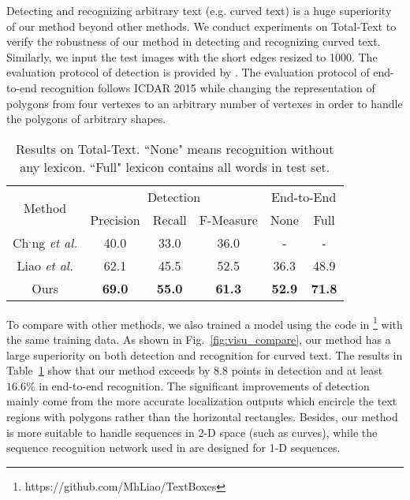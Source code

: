 \documentclass[runningheads]{llncs}
\begin{document}
Detecting and recognizing arbitrary text (e.g. curved text) is a huge superiority of our method beyond other methods. We conduct experiments on Total-Text to verify the robustness of our method in detecting and recognizing curved text. Similarly, we input the test images with the short edges resized to 1000.  The evaluation protocol of detection is provided by \cite{CK2017}.
The evaluation protocol of end-to-end recognition follows ICDAR 2015 while changing the representation of polygons from four vertexes to an arbitrary number of vertexes in order to handle the polygons of arbitrary shapes.

\begin{table}[!tp]
\begin{centering}
\caption{Results on Total-Text. ``None" means recognition without any lexicon. ``Full" lexicon contains all words in test set.}
\label{tab_total}
\begin{tabular}{|c|c|c|c|c|c|}
\hline 
\multirow{2}{*}{Method} & \multicolumn{3}{c|}{Detection} & \multicolumn{2}{c|}{End-to-End}\tabularnewline
\cline{2-6} 
 & Precision & Recall & F-Measure & None & Full\tabularnewline

\hline 
\hline
Ch$^,$ng \emph{et al.} \cite{CK2017} &40.0 &33.0 &36.0 &-  & - \tabularnewline
\hline
Liao \emph{et al.} \cite{liao2017textboxes} &62.1 &45.5  &52.5 & 36.3 & 48.9 \tabularnewline
\hline 
\hline 
Ours &\textbf{69.0} &\textbf{55.0}  &\textbf{61.3} &\textbf{52.9} &\textbf{71.8} \tabularnewline
\hline 
\end{tabular}
\par\end{centering}
\end{table}

To compare with other methods, we also trained a model \cite{liao2017textboxes} using the code in \cite{liao2017textboxes} \footnote{https://github.com/MhLiao/TextBoxes} 
with the same training data. As shown in Fig.~\ref{fig:visu_compare}, our method has a large superiority on both detection and recognition for curved text. The results in Table~\ref{tab_total} show that our method exceeds \cite{liao2017textboxes} by $8.8$ points in detection and at least $16.6\%$ in end-to-end recognition. The significant improvements of detection mainly come from the more accurate localization outputs which encircle the text regions with polygons rather than the horizontal rectangles. Besides, our method is more suitable to handle sequences in 2-D space (such as curves), while the sequence recognition network used in \cite{liao2017textboxes,Li_2017_ICCV,Busta_2017_ICCV} are designed for 1-D sequences.
\end{document}
